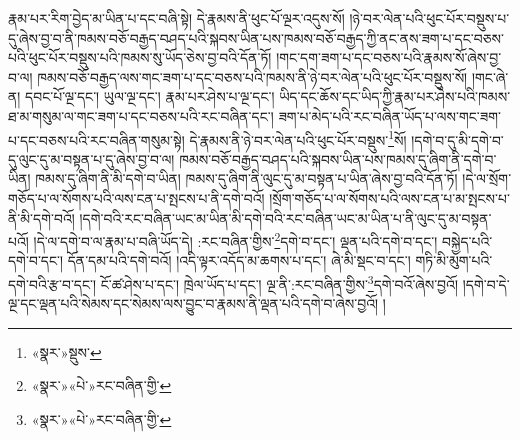 རྣམ་པར་རིག་བྱེད་མ་ཡིན་པ་དང་བཞི་སྟེ། དེ་རྣམས་ནི་ཕུང་པོ་ལྔར་འདུས་སོ། །ཉེ་བར་ལེན་པའི་ཕུང་པོར་བསྡུས་པ་དུ་ཞེས་བྱ་བ་ནི་ཁམས་བཅོ་བརྒྱད་བཤད་པའི་སྐབས་ཡིན་པས་ཁམས་བཅོ་བརྒྱད་ཀྱི་ནང་ནས་ཟག་པ་དང་བཅས་པའི་ཕུང་པོར་བསྡུས་པའི་ཁམས་སུ་ཡོད་ཅེས་བྱ་བའི་དོན་ཏོ། །གང་དག་ཟག་པ་དང་བཅས་པའི་རྣམས་སོ་ཞེས་བྱ་བ་ལ། ཁམས་བཅོ་བརྒྱད་ལས་གང་ཟག་པ་དང་བཅས་པའི་ཁམས་ནི་ཉེ་བར་ལེན་པའི་ཕུང་པོར་བསྡུས་སོ། །གང་ཞེ་ན། དབང་པོ་ལྔ་དང་། ཡུལ་ལྔ་དང་། རྣམ་པར་ཤེས་པ་ལྔ་དང་། ཡིད་དང་ཆོས་དང་ཡིད་ཀྱི་རྣམ་པར་ཤེས་པའི་ཁམས་ཐ་མ་གསུམ་ལ་གང་ཟག་པ་དང་བཅས་པའི་རང་བཞིན་དང་། ཟག་པ་མེད་པའི་རང་བཞིན་ཡོད་པ་ལས་གང་ཟག་པ་དང་བཅས་པའི་རང་བཞིན་གསུམ་སྟེ། དེ་རྣམས་ནི་ཉེ་བར་ལེན་པའི་ཕུང་པོར་བསྡུས་\footnote{«སྣར་»སྡུས་}སོ། །དགེ་བ་དུ་མི་དགེ་བ་དུ་ལུང་དུ་མ་བསྟན་པ་དུ་ཞེས་བྱ་བ་ལ། ཁམས་བཅོ་བརྒྱད་བཤད་པའི་སྐབས་ཡིན་པས་ཁམས་དུ་ཞིག་ནི་དགེ་བ་ཡིན། ཁམས་དུ་ཞིག་ནི་མི་དགེ་བ་ཡིན། ཁམས་དུ་ཞིག་ནི་ལུང་དུ་མ་བསྟན་པ་ཡིན་ཞེས་བྱ་བའི་དོན་ཏོ། །དེ་ལ་སྲོག་གཅོད་པ་ལ་སོགས་པའི་ལས་ངན་པ་སྤངས་པ་ནི་དགེ་བའོ། །སྲོག་གཅོད་པ་ལ་སོགས་པའི་ལས་ངན་པ་མ་སྤངས་པ་ནི་མི་དགེ་བའོ། །དགེ་བའི་རང་བཞིན་ཡང་མ་ཡིན་མི་དགེ་བའི་རང་བཞིན་ཡང་མ་ཡིན་པ་ནི་ལུང་དུ་མ་བསྟན་པའོ། །དེ་ལ་དགེ་བ་ལ་རྣམ་པ་བཞི་ཡོད་དེ། :རང་བཞིན་གྱིས་\footnote{«སྣར་»«པེ་»རང་བཞིན་གྱི་}དགེ་བ་དང་། ལྡན་པའི་དགེ་བ་དང་། བསྐྱེད་པའི་དགེ་བ་དང་། དོན་དམ་པའི་དགེ་བའོ། །འདི་ལྟར་འདོད་མ་ཆགས་པ་དང་། ཞེ་མི་སྡང་བ་དང་། གཏི་མི་མུག་པའི་དགེ་བའི་རྩ་བ་དང་། ངོ་ཚ་ཤེས་པ་དང་། ཁྲེལ་ཡོད་པ་དང་། ལྔ་ནི་:རང་བཞིན་གྱིས་\footnote{«སྣར་»«པེ་»རང་བཞིན་གྱི་}དགེ་བའོ་ཞེས་བྱའོ། །དགེ་བ་དེ་ལྔ་དང་ལྡན་པའི་སེམས་དང་སེམས་ལས་བྱུང་བ་རྣམས་ནི་ལྡན་པའི་དགེ་བ་ཞེས་བྱའོ། །
